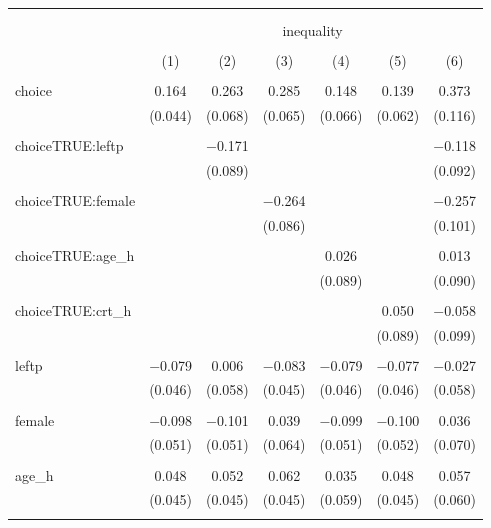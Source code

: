
\begin{table}[!htbp] \centering 
  \caption{} 
  \label{} 
\begin{tabular}{@{\extracolsep{5pt}}lcccccc} 
\\[-1.8ex]\hline 
\hline \\[-1.8ex] 
\\[-1.8ex] & \multicolumn{6}{c}{inequality} \\ 
\\[-1.8ex] & (1) & (2) & (3) & (4) & (5) & (6)\\ 
\hline \\[-1.8ex] 
 choice & 0.164 & 0.263 & 0.285 & 0.148 & 0.139 & 0.373 \\ 
  & (0.044) & (0.068) & (0.065) & (0.066) & (0.062) & (0.116) \\ 
  & & & & & & \\ 
 choiceTRUE:leftp &  & $-$0.171 &  &  &  & $-$0.118 \\ 
  &  & (0.089) &  &  &  & (0.092) \\ 
  & & & & & & \\ 
 choiceTRUE:female &  &  & $-$0.264 &  &  & $-$0.257 \\ 
  &  &  & (0.086) &  &  & (0.101) \\ 
  & & & & & & \\ 
 choiceTRUE:age\_h &  &  &  & 0.026 &  & 0.013 \\ 
  &  &  &  & (0.089) &  & (0.090) \\ 
  & & & & & & \\ 
 choiceTRUE:crt\_h &  &  &  &  & 0.050 & $-$0.058 \\ 
  &  &  &  &  & (0.089) & (0.099) \\ 
  & & & & & & \\ 
 leftp & $-$0.079 & 0.006 & $-$0.083 & $-$0.079 & $-$0.077 & $-$0.027 \\ 
  & (0.046) & (0.058) & (0.045) & (0.046) & (0.046) & (0.058) \\ 
  & & & & & & \\ 
 female & $-$0.098 & $-$0.101 & 0.039 & $-$0.099 & $-$0.100 & 0.036 \\ 
  & (0.051) & (0.051) & (0.064) & (0.051) & (0.052) & (0.070) \\ 
  & & & & & & \\ 
 age\_h & 0.048 & 0.052 & 0.062 & 0.035 & 0.048 & 0.057 \\ 
  & (0.045) & (0.045) & (0.045) & (0.059) & (0.045) & (0.060) \\ 
  & & & & & & \\ 

\end{tabular}
\end{table}
